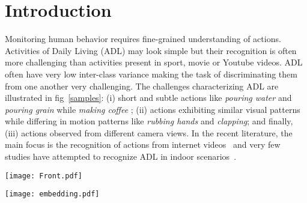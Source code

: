 \documentclass[runningheads]{llncs}
\begin{document}
\section{Introduction}
Monitoring human behavior requires fine-grained understanding of actions. Activities of Daily Living (ADL) may look simple but their recognition is often more challenging than activities present in sport, movie or Youtube videos. 
 ADL often have very low inter-class variance making the task of discriminating them from one another very challenging. The challenges characterizing ADL are illustrated in fig~\ref{samples}: (i)  short and subtle actions like \textit{pouring water} and \textit{pouring grain} while \textit{making coffee} ;
(ii) actions exhibiting similar visual patterns while differing in motion patterns like \textit{rubbing hands} and \textit{clapping}; and finally, (iii) actions observed from different camera views.
In the recent literature, the main focus is the recognition of actions from internet videos~\cite{i3d,nonlocal,slow_fast,TSN,video_transformer_network} and very few studies have attempted to recognize ADL in indoor scenarios~\cite{timeception,glimpse,STA_iccv}.


\iffalse 
In the recent literature, 3D convolutional networks pre-trained on huge video datasets like Kinetics~\cite{kinetics}, have led action recognition algorithms to high performance. 
Currently, state-of-the-art 3D convolutional networks like I3D~\cite{i3d} have successfully boosted the recognition of actions for internet videos~\cite{ucf,kinetics}. But, these networks with rigid spatio-temporal kernels cannot address the complex challenges exhibited by ADL. Attention mechanisms have thus been proposed on top of these 3D convolutional networks to guide them along the particularity of the actions~\cite{nonlocal,timeception,video_transformer_network}. 
\fi
\begin{minipage}{\textwidth}
  \begin{minipage}[b]{0.49\textwidth}
    \centering
    \texttt{[image: Front.pdf]}
    \vspace{0.1 in}
    \label{samples}
  \end{minipage}
  \hfill
  \begin{minipage}[b]{0.49\textwidth}
    \centering
    \texttt{[image: embedding.pdf]}
    \vspace{0.1 in}
    \label{spatial_embedding}
  \end{minipage}
  \end{minipage}
\end{document}
